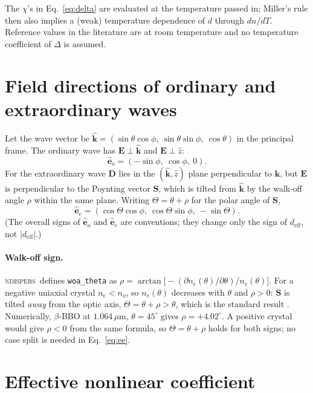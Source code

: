 \documentclass[aps,pra,preprint,amsmath,amssymb,nofootinbib,superscriptaddress]{revtex4-2}
\newcommand{\ueff}{d_{\mathrm{eff}}}
\newcommand{\vecu}[1]{\hat{\bm{#1}}}
\newcommand{\ndispers}{\textsc{ndispers}}
\begin{document}
The $\chi$'s in Eq.~\eqref{eq:delta} are evaluated at the temperature
passed in; Miller's rule then also implies a (weak) temperature dependence
of $d$ through $dn/dT$. Reference values in the literature are at room
temperature and no temperature coefficient of $\Delta$ is assumed.

\section{Field directions of ordinary and extraordinary waves}
\label{sec:fields}

Let the wave vector be
$\vecu{k}=(\sin\theta\cos\phi,\ \sin\theta\sin\phi,\ \cos\theta)$ in the
principal frame. The ordinary wave has $\bm E\perp\vecu{k}$ and
$\bm E\perp\hat z$:
\begin{equation}
  \vecu{e}_o = (-\sin\phi,\ \cos\phi,\ 0).
  \label{eq:eo}
\end{equation}
For the extraordinary wave $\bm D$ lies in the $(\vecu k,\hat z)$ plane
perpendicular to $\vecu k$, but $\bm E$ is perpendicular to the Poynting
vector $\bm S$, which is tilted from $\vecu k$ by the walk-off angle
$\rho$ within the same plane. Writing $\Theta=\theta+\rho$ for the polar
angle of $\bm S$,
\begin{equation}
  \vecu{e}_e = (\cos\Theta\cos\phi,\ \cos\Theta\sin\phi,\ -\sin\Theta).
  \label{eq:ee}
\end{equation}
(The overall signs of $\vecu e_o$ and $\vecu e_e$ are conventions; they
change only the sign of $\ueff$, not $|\ueff|$.)

\paragraph*{Walk-off sign.}
\ndispers\ defines \texttt{woa\_theta} as
$\rho = \arctan\!\big[-(\partial n_e(\theta)/\partial\theta)/n_e(\theta)\big]$.
For a negative uniaxial crystal $n_e<n_o$, so $n_e(\theta)$ decreases with
$\theta$ and $\rho>0$: $\bm S$ is tilted \emph{away} from the optic axis,
$\Theta=\theta+\rho>\theta$, which is the standard result
\cite{Boyd,Dmitriev}. Numerically, $\beta$-BBO at $1.064\,\mu$m,
$\theta=45^\circ$ gives $\rho=+4.02^\circ$. A positive crystal would give
$\rho<0$ from the same formula, so $\Theta=\theta+\rho$ holds for both
signs; no case split is needed in Eq.~\eqref{eq:ee}.

\section{Effective nonlinear coefficient}
\label{sec:deff}
\end{document}
